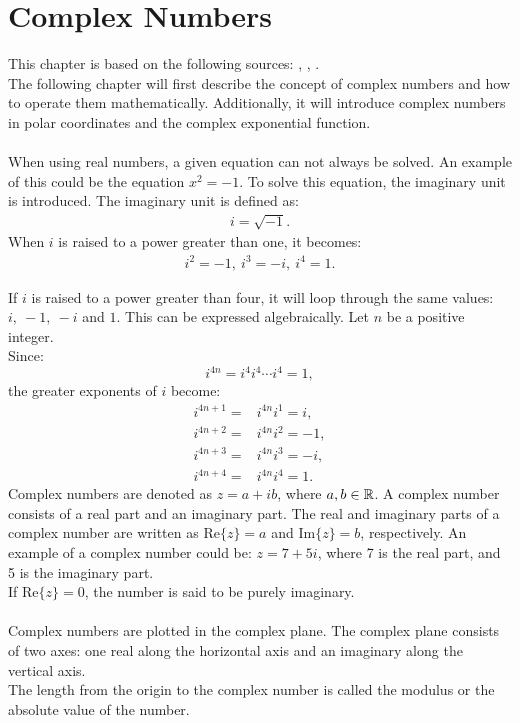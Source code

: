 \chapter{Complex Numbers}
This chapter is based on the following sources: \cite{complexpaul}, \cite{complexpurple}, \cite{complexnotebook}.
\\
\noindent 
The following chapter will first describe the concept of complex numbers and how to operate them mathematically. Additionally, it will introduce complex numbers in polar coordinates and the complex exponential function. %
\\\\
\noindent 
When using real numbers, a given equation can not always be solved. An example of this could be the equation $x^2=-1$. To solve this equation, the imaginary unit is introduced. The imaginary unit is defined as:
\begin{align*}
i=\sqrt{-1}.
\end{align*}
When $i$ is raised to a power greater than one, it becomes:
\begin{align*}
i^2=-1,\  i^3=-i,\  i^4=1.
\end{align*}

\noindent If $i$ is raised to a power greater than four, it will loop through the same values: $i, \ -1, \ -i$ and $1$. This can be expressed algebraically. Let $n$ be a positive integer. 
\\
Since: $$i^{4n} = i^4i^4\cdots i^4 = 1,$$
the greater exponents of $i$ become:
\begin{align*}
	i^{4n+1} =& i^{4n}i^1 = i, \\
	i^{4n+2} =& i^{4n}i^2 = -1, \\
	i^{4n+3} =& i^{4n}i^3 = -i, \\
	i^{4n+4} =& i^{4n}i^4 = 1.
\end{align*}
Complex numbers are denoted as $z = a+ib$, where $a,b\in \mathbb{R}$. A complex number consists of a real part and an imaginary part. The real and imaginary parts of a complex number are written as $\text{Re}\{z\}=a$ and $\text{Im}\{z\}=b$, respectively.
An example of a complex number could be: $z=7+5i$, where 7 is the real part, and 5 is the imaginary part. 
\\
If $\text{Re}\{z\}=0$, the number is said to be purely imaginary.  
\\\\
Complex numbers are plotted in the complex plane. The complex plane consists of two axes: one real along the horizontal axis and an imaginary along the vertical axis.\\
The length from the origin to the complex number is called the modulus or the absolute value of the number.


